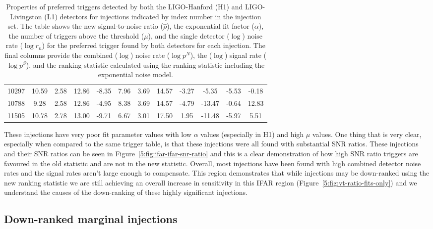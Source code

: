 \begin{table}[ht]
\begin{tabular}{lccccccccccc}
        10297 & 10.59 & 2.58 & 12.86 & -8.35 & 7.96 & 3.69 & 14.57 & -3.27 & -5.35 & -5.53 & -0.18 \\
        10788 & 9.28 & 2.58 & 12.86 & -4.95 & 8.38 & 3.69 & 14.57 & -4.79 & -13.47 & -0.64 & 12.83 \\
        11505 & 10.78 & 2.78 & 13.00 & -9.71 & 6.67 & 3.01 & 17.50 & 1.95 & -11.48 & -5.97 & 5.51 \\
        \bottomrule
    \end{tabular}
    \caption{Properties of preferred triggers detected by both the LIGO-Hanford (H1) and LIGO-Livingston (L1) detectors for injections indicated by index number in the injection set. The table shows the new signal-to-noise ratio ($\hat{\rho}$), the exponential fit factor ($\alpha$), the number of triggers above the threshold ($\mu$), and the single detector ($\log$) noise rate ($\log r_n$) for the preferred trigger found by both detectors for each injection. The final columns provide the combined ($\log$) noise rate ($\log p^{N}$), the ($\log$) signal rate ($\log p^{S}$), and the ranking statistic calculated using the ranking statistic including the exponential noise model.}
    \label{5:tab:top-right-diff-temp-fits}
\end{table}
%
These injections have very poor fit parameter values with low $\alpha$ values (especially in H1) and high $\mu$ values. One thing that is very clear, especially when compared to the same trigger table, is that these injections were all found with substantial SNR ratios. These injections and their SNR ratios can be seen in Figure~\ref{5:fig:ifar-ifar-snr-ratio} and this is a clear demonstration of how high SNR ratio triggers are favoured in the old statistic and are not in the new statistic. Overall, most injections have been found with high combined detector noise rates and the signal rates aren't large enough to compensate. This region demonstrates that while injections may be down-ranked using the new ranking statistic we are still achieving an overall increase in sensitivity in this IFAR region (Figure~\ref{5:fig:vt-ratio-fits-only}) and we understand the causes of the down-ranking of these highly significant injections.


\subsection{\label{5:sec:middle-region}Down-ranked marginal injections}

